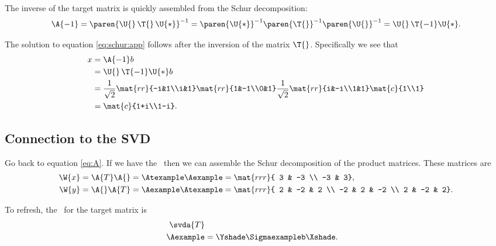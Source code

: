 The inverse of the target matrix is quickly assembled from the Schur decomposition:
\begin{equation}
  \A{-1}=\paren{\U{}\,\T{}\,\U{*}}^{-1}=\paren{\U{*}}^{-1}\paren{\T{}}^{-1}\paren{\U{}}^{-1}=\U{}\,\T{-1}\U{*}.
\end{equation}

The solution to equation \eqref{eq:schur:app} follows after the inversion of the matrix $\T{}$. Specifically we see that
\begin{equation}
  \begin{split}
    x &= \A{-1}b\\
      &= \U{}\,\T{-1}\U{*} b\\
      &= \frac{1}{\sqrt{2}}\mat{rr}{-i&1\\i&1}
                      \mat{rr}{1&-1\\0&1}
    \frac{1}{\sqrt{2}}\mat{rr}{i&-i\\1&1}\mat{c}{1\\1}\\
    & = \mat{c}{1+i\\1-i}.
  \end{split}
\end{equation}

\subsection{Connection to the SVD}
Go back to equation \eqref{eq:A}. If we have the \svdl \ then we can assemble the Schur decomposition of the product matrices. These matrices are
\begin{equation*}
  \begin{split}
    \W{x} &= \A{T}\A{} = \Atexample\Aexample = \mat{rrr}
    {
  3 & -3  \\
 -3 &  3},\\
    \W{y} &= \A{}\A{T} = \Aexample\Atexample = \mat{rrr}
    {
  2 & -2 &  2 \\
 -2 &  2 & -2 \\
  2 & -2 &  2}.
  \end{split}
\end{equation*}

To refresh, the \svdl \ for the target matrix is
\begin{equation}
  \begin{split}
    \svda{T} \\
    \Aexample &= \Yshade\Sigmaexampleb\Xshade.
  \end{split}
\end{equation}

